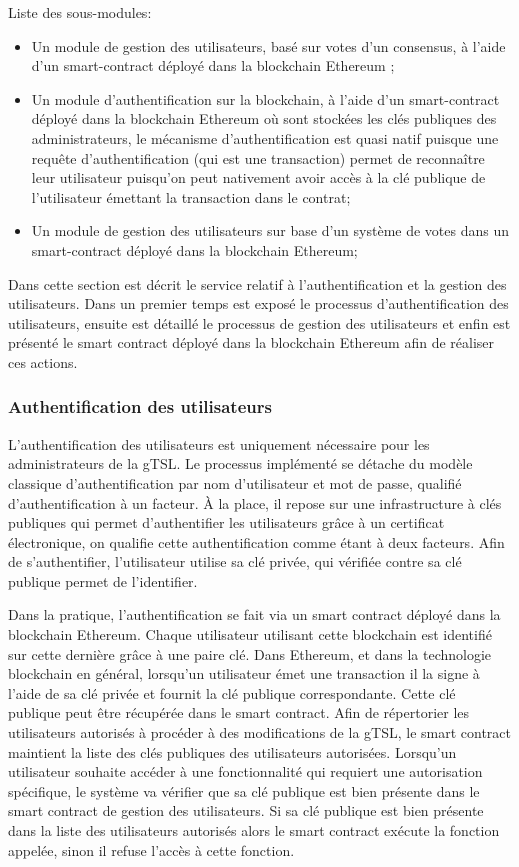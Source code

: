 \documentclass{tnreport}
\begin{document}
Liste des sous-modules:
\begin{itemize}
	\item Un module de gestion des utilisateurs, basé sur votes d’un consensus, à l’aide d’un smart-contract déployé dans la blockchain Ethereum ;
	\item Un module d'authentification sur la blockchain, à l’aide d’un smart-contract déployé dans la blockchain Ethereum où sont stockées les clés publiques des administrateurs, le mécanisme d'authentification est quasi natif puisque une requête d'authentification (qui est une transaction) permet de reconnaître leur utilisateur puisqu'on peut nativement avoir accès à la clé publique de l'utilisateur émettant la transaction dans le contrat;
	\item Un module de gestion des utilisateurs sur base d'un système de votes dans un smart-contract déployé dans la blockchain Ethereum;
\end{itemize}
\fi

Dans cette section est décrit le service relatif à l'authentification et la gestion des utilisateurs. Dans un premier temps est exposé le processus d'authentification des utilisateurs, ensuite est détaillé le processus de gestion des utilisateurs et enfin est présenté le smart contract déployé dans la blockchain Ethereum afin de réaliser ces actions.

\subsubsection{Authentification des utilisateurs}

L'authentification des utilisateurs est uniquement nécessaire pour les administrateurs de la gTSL. Le processus implémenté se détache du modèle classique d'authentification par nom d'utilisateur et mot de passe, qualifié d'authentification à un facteur. À la place, il repose sur une infrastructure à clés publiques qui permet d'authentifier les utilisateurs grâce à un certificat électronique, on qualifie cette authentification comme étant à deux facteurs. Afin de s'authentifier, l'utilisateur utilise sa clé privée, qui vérifiée contre sa clé publique permet de l'identifier.

Dans la pratique, l'authentification se fait via un smart contract déployé dans la blockchain Ethereum. Chaque utilisateur utilisant cette blockchain est identifié sur cette dernière grâce à une paire clé.
Dans Ethereum, et dans la technologie blockchain en général, lorsqu'un utilisateur émet une transaction il la signe à l'aide de sa clé privée et fournit la clé publique correspondante. Cette clé publique peut être récupérée dans le smart contract. 
Afin de répertorier les utilisateurs autorisés à procéder à des modifications de la gTSL, le smart contract maintient la liste des clés publiques des utilisateurs autorisées. 
Lorsqu'un utilisateur souhaite accéder à une fonctionnalité qui requiert une autorisation spécifique, le système va vérifier que sa clé publique est bien présente dans le smart contract de gestion des utilisateurs. Si sa clé publique est bien présente dans la liste des utilisateurs autorisés alors le smart contract exécute la fonction appelée, sinon il refuse l'accès à cette fonction.
\end{document}
